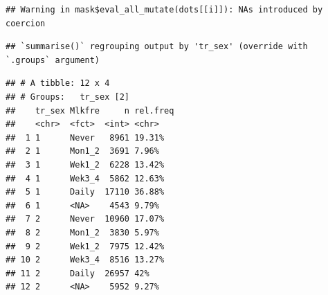 \documentclass[
]{article}
\newenvironment{Shaded}{\begin{snugshade}}{\end{snugshade}}
\newcommand{\DataTypeTok}[1]{\textcolor[rgb]{0.13,0.29,0.53}{#1}}
\newcommand{\DecValTok}[1]{\textcolor[rgb]{0.00,0.00,0.81}{#1}}
\newcommand{\KeywordTok}[1]{\textcolor[rgb]{0.13,0.29,0.53}{\textbf{#1}}}
\newcommand{\NormalTok}[1]{#1}
\newcommand{\OperatorTok}[1]{\textcolor[rgb]{0.81,0.36,0.00}{\textbf{#1}}}
\newcommand{\StringTok}[1]{\textcolor[rgb]{0.31,0.60,0.02}{#1}}
\begin{document}
\begin{verbatim}
## Warning in mask$eval_all_mutate(dots[[i]]): NAs introduced by coercion
\end{verbatim}

\begin{Shaded}
\end{Shaded}

\begin{verbatim}
## `summarise()` regrouping output by 'tr_sex' (override with `.groups` argument)
\end{verbatim}

\begin{verbatim}
## # A tibble: 12 x 4
## # Groups:   tr_sex [2]
##    tr_sex Mlkfre     n rel.freq
##    <chr>  <fct>  <int> <chr>   
##  1 1      Never   8961 19.31%  
##  2 1      Mon1_2  3691 7.96%   
##  3 1      Wek1_2  6228 13.42%  
##  4 1      Wek3_4  5862 12.63%  
##  5 1      Daily  17110 36.88%  
##  6 1      <NA>    4543 9.79%   
##  7 2      Never  10960 17.07%  
##  8 2      Mon1_2  3830 5.97%   
##  9 2      Wek1_2  7975 12.42%  
## 10 2      Wek3_4  8516 13.27%  
## 11 2      Daily  26957 42%     
## 12 2      <NA>    5952 9.27%
\end{verbatim}

\begin{Shaded}
\end{Shaded}
\end{document}
